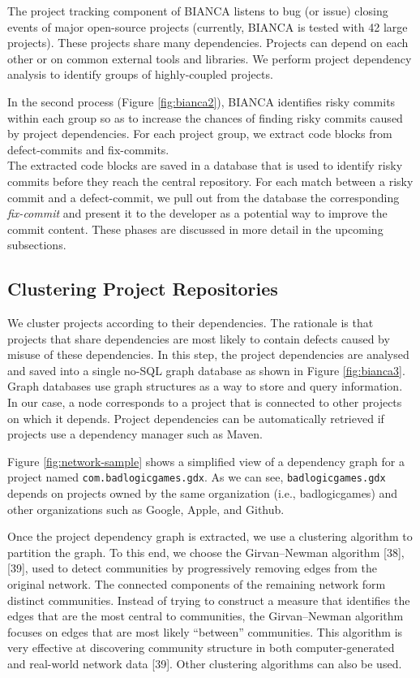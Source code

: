 \documentclass[conference]{IEEEtran}
\begin{document}


The project tracking component of BIANCA listens to bug (or issue)
closing events of major open-source projects (currently, BIANCA is
tested with 42 large projects). These projects share many dependencies.
Projects can depend on each other or on common external tools and
libraries. We perform project dependency analysis to identify groups of
highly-coupled projects.

In the second process (Figure \ref{fig:bianca2}), BIANCA identifies
risky commits within each group so as to increase the chances of finding
risky commits caused by project dependencies. For each project group, we
extract code blocks from defect-commits and fix-commits.\\The extracted
code blocks are saved in a database that is used to identify risky
commits before they reach the central repository. For each match between
a risky commit and a defect-commit, we pull out from the database the
corresponding \emph{fix-commit} and present it to the developer as a
potential way to improve the commit content. These phases are discussed
in more detail in the upcoming subsections.

\subsection{Clustering Project Repositories}\label{sec:clustering}

We cluster projects according to their dependencies. The rationale is
that projects that share dependencies are most likely to contain defects
caused by misuse of these dependencies. In this step, the project
dependencies are analysed and saved into a single no-SQL graph database
as shown in Figure \ref{fig:bianca3}. Graph databases use graph
structures as a way to store and query information. In our case, a node
corresponds to a project that is connected to other projects on which it
depends. Project dependencies can be automatically retrieved if projects
use a dependency manager such as Maven.

Figure \ref{fig:network-sample} shows a simplified view of a dependency
graph for a project named \texttt{com.badlogicgames.gdx}. As we can see,
\texttt{badlogicgames.gdx} depends on projects owned by the same
organization (i.e., badlogicgames) and other organizations such as
Google, Apple, and Github.



Once the project dependency graph is extracted, we use a clustering
algorithm to partition the graph. To this end, we choose the
Girvan--Newman algorithm {[}38{]}, {[}39{]}, used to detect communities
by progressively removing edges from the original network. The connected
components of the remaining network form distinct communities. Instead
of trying to construct a measure that identifies the edges that are the
most central to communities, the Girvan--Newman algorithm focuses on
edges that are most likely ``between'' communities. This algorithm is
very effective at discovering community structure in both
computer-generated and real-world network data {[}39{]}. Other
clustering algorithms can also be used.
\end{document}
